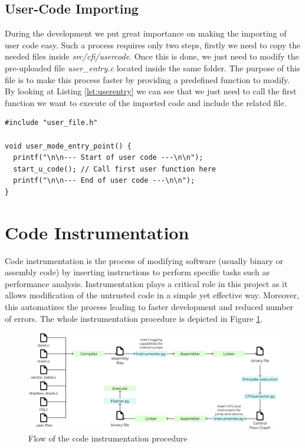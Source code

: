 \subsection{User-Code Importing}
\label{subsec:project_ucodeimport}

During the development we put great importance on making the importing of user
code easy. Such a process requires only two steps, firstly we need to copy the
needed files inside \textit{src/cfi/usercode}. Once this is done, we just need to
modify the pre-uploaded file \textit{user\_entry.c} located inside the same
folder. The purpose of this file is to make this process faster by providing a predefined
function to modify. By looking at Listing \ref{lst:userentry} we can see that we
just need to call the first function we want to execute of the imported code and
include the related file. \\ \begin{lstlisting}[style=CStyle, caption = \textit{user\_entry.c} file, label={lst:userentry}]
#include "user_file.h"

void user_mode_entry_point() {
  printf("\n\n--- Start of user code ---\n\n");
  start_u_code(); // Call first user function here
  printf("\n\n--- End of user code ---\n\n");
}
\end{lstlisting}

\section{Code Instrumentation}
\label{sec:project_instrumentation}

Code instrumentation is the process of modifying software (usually binary or
assembly code) by inserting instructions to perform specific tasks such as performance
analysis. Instrumentation plays a critical role in this project as it allows
modification of the untrusted code in a simple yet effective way. Moreover, this
automatizes the process leading to faster development and reduced number of
errors. The whole instrumentation procedure is depicted in Figure \ref{fig:instrumentation}.
\\
\begin{figure}[htbp]
  \centering
  \includegraphics[width=.9\linewidth]{images/instrumentation.png}
  \caption{Flow of the code instrumentation procedure}
  \label{fig:instrumentation}
\end{figure}
\\

